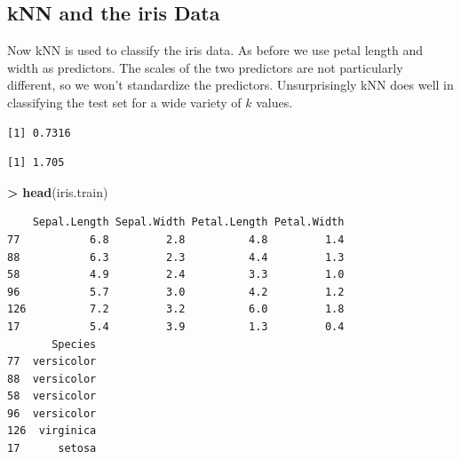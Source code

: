 \documentclass[
]{krantz}
\makeatletter
\newenvironment{Shaded}{\begin{snugshade}}{\end{snugshade}}
\newcommand{\KeywordTok}[1]{\textcolor[rgb]{0.27,0.27,0.27}{\textbf{#1}}}
\newcommand{\NormalTok}[1]{#1}
\newcommand{\OperatorTok}[1]{\textcolor[rgb]{0.43,0.43,0.43}{\textbf{#1}}}
\newcommand{\StringTok}[1]{\textcolor[rgb]{0.5,0.5,0.5}{#1}}
\newenvironment{kframe}{%
\medskip{}
\setlength{\fboxsep}{.8em}
 \def\at@end@of@kframe{}%
 \ifinner\ifhmode%
  \def\at@end@of@kframe{\end{minipage}}%
  \begin{minipage}{\columnwidth}%
 \fi\fi%
 \def\FrameCommand##1{\hskip\@totalleftmargin \hskip-\fboxsep
 \colorbox{shadecolor}{##1}\hskip-\fboxsep
     \hskip-\linewidth \hskip-\@totalleftmargin \hskip\columnwidth}%
 \MakeFramed {\advance\hsize-\width
   \@totalleftmargin\z@ \linewidth\hsize
   \@setminipage}}%
 {\par\unskip\endMakeFramed%
 \at@end@of@kframe}
\renewenvironment{Shaded}{\begin{kframe}}{\end{kframe}}
\makeatother
\begin{document}
\hypertarget{knn-and-the-iris-data}{%
\subsection{kNN and the iris Data}\label{knn-and-the-iris-data}}

Now kNN is used to classify the iris data. As before we use petal length and width as predictors. The scales of the two predictors are not particularly different, so we won't standardize the predictors. Unsurprisingly kNN does well in classifying the test set for a wide variety of \(k\) values.

\begin{Shaded}
\end{Shaded}

\begin{verbatim}
[1] 0.7316
\end{verbatim}

\begin{Shaded}
\end{Shaded}

\begin{verbatim}
[1] 1.705
\end{verbatim}

\begin{Shaded}
\begin{Highlighting}[]
\OperatorTok{\textgreater{}}\StringTok{ }\KeywordTok{head}\NormalTok{(iris.train)}
\end{Highlighting}
\end{Shaded}

\begin{verbatim}
    Sepal.Length Sepal.Width Petal.Length Petal.Width
77           6.8         2.8          4.8         1.4
88           6.3         2.3          4.4         1.3
58           4.9         2.4          3.3         1.0
96           5.7         3.0          4.2         1.2
126          7.2         3.2          6.0         1.8
17           5.4         3.9          1.3         0.4
       Species
77  versicolor
88  versicolor
58  versicolor
96  versicolor
126  virginica
17      setosa
\end{verbatim}
\end{document}
